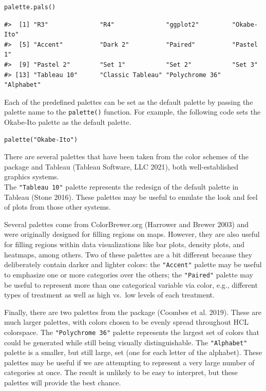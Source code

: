 \begin{verbatim}
palette.pals()
\end{verbatim}

\begin{verbatim}
#>  [1] "R3"              "R4"              "ggplot2"         "Okabe-Ito"      
#>  [5] "Accent"          "Dark 2"          "Paired"          "Pastel 1"       
#>  [9] "Pastel 2"        "Set 1"           "Set 2"           "Set 3"          
#> [13] "Tableau 10"      "Classic Tableau" "Polychrome 36"   "Alphabet"
\end{verbatim}

Each of the predefined palettes can be set as the default palette by passing
the palette name to the \texttt{palette()} function. For example,
the following code sets the Okabe-Ito palette as the default palette.

\begin{verbatim}
palette("Okabe-Ito")
\end{verbatim}

There are several palettes that have been taken from the color schemes of
the  package and Tableau (Tableau Software, LLC 2021), both
well-established graphics systems.\\
The \texttt{"Tableau\ 10"} palette
represents the redesign of the default palette in Tableau (Stone 2016).
These palettes may be useful
to emulate the look and feel of plots from those other systems.

Several palettes come from ColorBrewer.org (Harrower and Brewer 2003) and
were originally designed for filling regions on maps. However, they
are also useful for filling regions within data visualizations like bar plots,
density plots, and heatmaps, among others.
Two of these palettes are a bit different because
they deliberately contain darker and lighter colors:
the \texttt{"Accent"} palette may be useful to emphasize one or more categories
over the others;
the \texttt{"Paired"} palette may be useful to represent more than one
categorical variable via color, e.g., different types of treatment
as well as high vs.~low levels of each treatment.

Finally, there are two palettes from the
 package (Coombes et al. 2019).
These are much larger palettes, with colors chosen to be evenly
spread throughout HCL colorspace. The \texttt{"Polychrome~36"} palette
represents the largest set of colors that could be generated
while still being visually distinguishable. The \texttt{"Alphabet"}
palette is a smaller, but still large, set (one for each letter
of the alphabet). These palettes
may be useful if we are attempting to represent a very large
number of categories at once. The result is unlikely to be
easy to interpret, but these palettes will provide the best chance.

